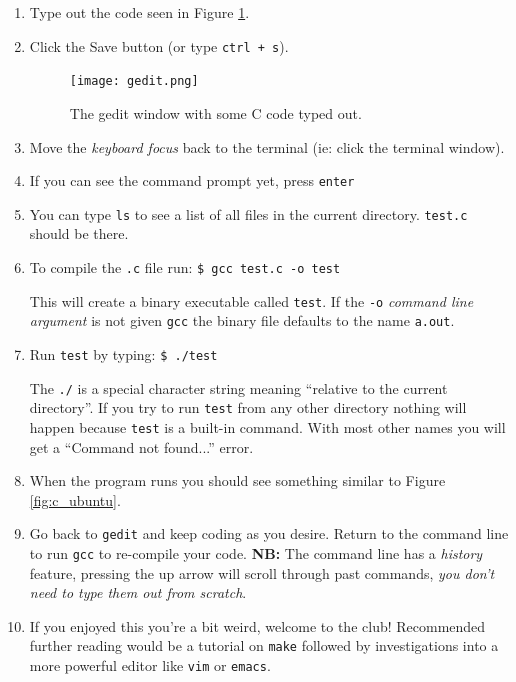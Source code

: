 \documentclass{lab}
\begin{document}
\begin{enumerate}
\item Type out the code seen in Figure \ref{fig:gedit}.

\item Click the Save button (or type \texttt{ctrl + s}).

\begin{figure}[H]
\begin{center}
\texttt{[image: gedit.png]}
\end{center}
\caption{The gedit window with some C code typed out.}\label{fig:gedit}
\end{figure}

\item Move the \textit{keyboard focus} back to the terminal (ie: click the terminal window).

\item If you can see the command prompt yet, press \texttt{enter}

\item You can type \texttt{ls} to see a list of all files in the current directory. \texttt{test.c} should be there.

\item To compile the \texttt{.c} file run: \texttt{\$ gcc test.c -o test}

This will create a binary executable called \texttt{test}. If the \texttt{-o} \textit{command line argument} is not given \texttt{gcc} the binary file defaults to the name \texttt{a.out}.

\item Run \texttt{test} by typing: \texttt{\$ ./test}

The \texttt{./} is a special character string meaning ``relative to the current directory''. If you try to run \texttt{test} from any other directory nothing will happen because \texttt{test} is a built-in command. With most other names you will get a ``Command not found...'' error.

\item When the program runs you should see something similar to Figure \ref{fig:c_ubuntu}.

\item Go back to \texttt{gedit} and keep coding as you desire. Return to the command line to run \texttt{gcc} to re-compile your code. \textbf{NB:} The command line has a \textit{history} feature, pressing the up arrow will scroll through past commands, \textit{you don't need to type them out from scratch}.

\item If you enjoyed this you're a bit weird, welcome to the club! Recommended further reading would be a tutorial on \texttt{make} followed by investigations into a more powerful editor like \texttt{vim} or \texttt{emacs}.
\end{enumerate}
\end{document}
